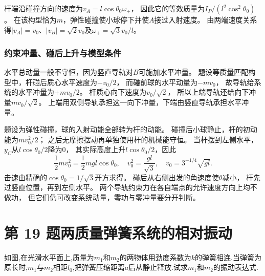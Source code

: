 \documentclass[UTF8,fontset=fandol,a4paper,11pt]{ctexart}
\newcommand{\tagline}[1]{\noindent{\small\color{muted}#1}\par}
\newcommand{\figcaption}[1]{\par\vspace{2pt}{\small\color{muted}#1}\par}
\begin{document}
杆端沿碰撞方向的速度为$v_A=l\cos\theta_0\omega_+$，
因此它的等效质量为$I_P/(l^2\cos^2\theta_0)$。
在该构型恰为$m$，弹性碰撞使小球停下并使$A$接过入射速度。
由两端速度关系得$|v_A|=v_0$、$|v_B|=\sqrt2v_0$及$\omega_+=\sqrt3v_0/l$。

\subsubsection*{约束冲量、碰后上升与模型条件}
水平总动量一般不守恒，因为竖直导轨对$B$可施加水平冲量。
题设等质量匹配构型中，杆碰后质心水平速度为$-v_0/2$，
而碰前球的水平动量为$-mv_0$，
故导轨给系统的水平冲量为$+mv_0/2$。
杆质心向下速度为$v_0/\sqrt2$，
所以上端导轨还给向下冲量$mv_0/\sqrt2$。
上端用双侧导轨承担这一向下冲量，下端由竖直导轨承担水平冲量。

题设为弹性碰撞，球的入射动能全部转为杆的动能。
碰撞后小球静止，杆的初动能为$mv_0^2/2$；
之后无摩擦摆动再单独使用杆的机械能守恒。
当杆摆到左侧水平，$y_C$从$l\cos\theta_0/2$降为0，
其实际高度上升$l\cos\theta_0/2$，因此
\[
\frac12mv_0^2=\frac12mgl\cos\theta_0,
\quad v_0^2=\frac{gl}{\sqrt3},\quad
v_0=3^{-1/4}\sqrt{gl}.
\]
击速由精确的$\cos\theta_0=1/\sqrt3$开方求得。
碰后从右侧出发的角速度使$\theta$减小，
杆先过竖直位置，再到左侧水平。
两个导轨约束力在各自端点的允许速度方向上均不做功，
但它们仍可改变系统动量，零功与零冲量要分开判断。




\section*{第 19 题\quad 两质量弹簧系统的相对振动}

\tagline{M-07-19}

如图,在光滑水平面上,质量为\(m_{1}\)和\(m_{2}\)的两物体用劲度系数为\(k\)的弹簧相连.当弹簧为原长时,\(m_{1}\)与\(m_{2}\)相距\(l_{0}\),把弹簧压缩距离\(a\)后从静止释放.试求\(m_{1}\)和\(m_{2}\)的振动表达式.

\begin{center}\begin{minipage}{\linewidth}\centering{}\figcaption{图 7.19}\end{minipage}\end{center}
\end{document}
